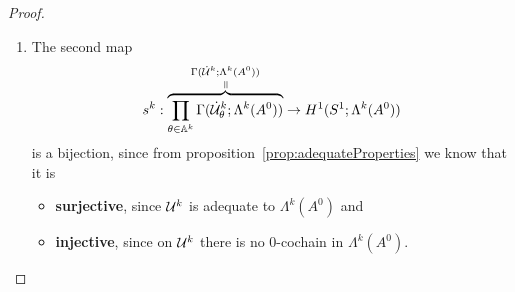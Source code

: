 \begin{proof}
\begin{enumerate}
\begin{comment}
                ODE-Theory, says that a germ defines a solution in a
                \textbf{neighbourhood}
              \item \PROBLEM[why is th neighbourhood large enough?] I.e.\
                \[
                  \substack{the\\neighbourhood}\supset\cU_\theta^k \,?
                \]
            \end{itemize}
        \end{itemize}
      \end{comment}
    \item The second map
      \[
        s^k:
        \overset{\Gamma(\dot\cU^k;\Lambda^k(A^0))}{%
          \overset{\text{\rotatebox[origin=c]{-90}{$=$}}}{%
            \overbrace{%
              \prod_{\theta\in\A^k}\Gamma(\dot\cU_\theta^k;\Lambda^k(A^0))
            }
        }}
        \to
        H^1(S^1;\Lambda^k(A^0))
      \]
      is a bijection, since from proposition~\ref{prop:adequateProperties} we
      know that it is
      \begin{itemize}
        \item \textbf{surjective}, since $\mathcal{U}^k$ is adequate to
          $\Lambda^k(A^0)$ and
        \item \textbf{injective}, since on $\mathcal{U}^k$ there is no $0$-cochain in
          $\Lambda^k(A^0)$.
      \end{itemize}
  \end{enumerate}
  \PROBLEM[Naturality?]
\end{proof}


